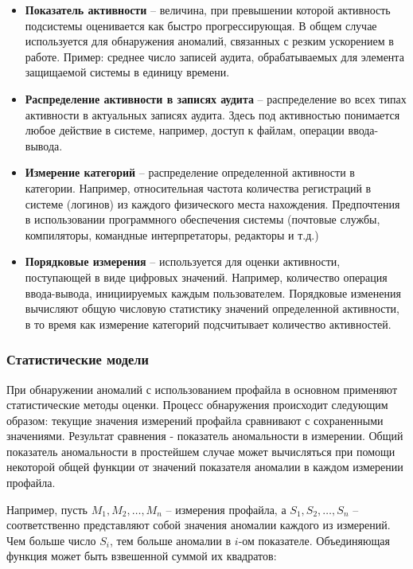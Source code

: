 \begin{itemize}
	\item \textbf{Показатель активности} -- величина, при превышении которой активность подсистемы оценивается как быстро прогрессирующая. В общем случае используется для обнаружения аномалий, связанных с резким ускорением в работе. Пример: среднее число записей аудита, обрабатываемых для элемента защищаемой системы в единицу времени.
	\item \textbf{Распределение активности в записях аудита} -- распределение во всех типах активности в актуальных записях аудита. Здесь под активностью понимается любое действие в системе, например, доступ к файлам, операции ввода-вывода.
	\item \textbf{Измерение категорий} -- распределение определенной активности в категории\footnotemark. Например, относительная частота количества регистраций в системе (логинов) из каждого физического места нахождения. Предпочтения в использовании программного обеспечения системы (почтовые службы, компиляторы, командные интерпретаторы, редакторы и т.д.)
	\item \textbf{Порядковые измерения} -- используется для оценки активности, поступающей в виде цифровых значений. Например, количество операция ввода-вывода, инициируемых каждым пользователем. Порядковые изменения вычисляют общую числовую статистику значений определенной активности, в то время как измерение категорий подсчитывает количество активностей.
\end{itemize}


\subsubsection*{Статистические модели}

При обнаружении аномалий с использованием профайла в основном применяют статистические методы оценки. Процесс обнаружения происходит следующим образом: текущие значения измерений профайла сравнивают с сохраненными значениями. Результат сравнения - показатель аномальности в измерении. Общий показатель аномальности в простейшем случае может вычисляться при помощи некоторой общей функции от значений показателя аномалии в каждом измерении профайла.

Например, пусть $M_1, M_2, \dots, M_n$ -- измерения профайла, а $S_1, S_2, \dots, S_n$ -- соответственно представляют собой значения аномалии каждого из измерений. Чем больше число $S_i$, тем больше аномалии в $i$-ом показателе. Объединяющая функция может быть взвешенной суммой их квадратов:

